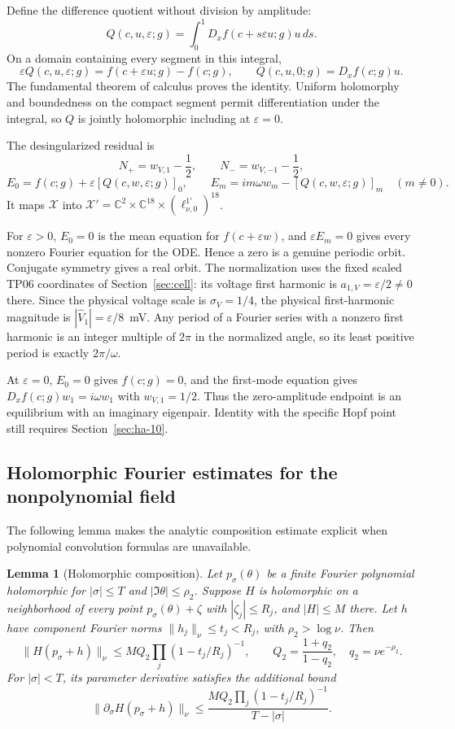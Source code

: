 \documentclass[11pt]{article}
\newtheorem{lemma}{Lemma}[section]
\theoremstyle{definition}
\begin{document}
Define the difference quotient without division by amplitude:
\[
 Q(c,u,\varepsilon;g)
 =\int_0^1 D_xf(c+s\varepsilon u;g)u\,ds.
\]
On a domain containing every segment in this integral,
\[
 \varepsilon Q(c,u,\varepsilon;g)
       =f(c+\varepsilon u;g)-f(c;g),
 \qquad Q(c,u,0;g)=D_xf(c;g)u.
\]
The fundamental theorem of calculus proves the identity. Uniform holomorphy and boundedness on the compact segment permit differentiation under the integral, so $Q$ is jointly holomorphic including at $\varepsilon=0$.

The desingularized residual is
\[
 N_+=w_{V,1}-\frac12,\qquad N_-=w_{V,-1}-\frac12,
\]
\[
 E_0=f(c;g)+\varepsilon[Q(c,w,\varepsilon;g)]_0,\qquad
 E_m=im\omega w_m-[Q(c,w,\varepsilon;g)]_m\quad(m\ne0).
\]
It maps $\mathcal X$ into
$\mathcal X'=\mathbb C^2\times\mathbb C^{18}\times(\ell^{1\prime}_{\nu,0})^{18}$.

For $\varepsilon>0$, $E_0=0$ is the mean equation for $f(c+\varepsilon w)$, and $\varepsilon E_m=0$ gives every nonzero Fourier equation for the ODE. Hence a zero is a genuine periodic orbit. Conjugate symmetry gives a real orbit. The normalization uses the fixed scaled TP06 coordinates of Section~\ref{sec:cell}: its voltage first harmonic is $a_{1,V}=\varepsilon/2\ne0$ there. Since the physical voltage scale is $\sigma_V=1/4$, the physical first-harmonic magnitude is $|\widehat V_1|=\varepsilon/8$~mV. Any period of a Fourier series with a nonzero first harmonic is an integer multiple of $2\pi$ in the normalized angle, so its least positive period is exactly $2\pi/\omega$.

At $\varepsilon=0$, $E_0=0$ gives $f(c;g)=0$, and the first-mode equation gives $D_xf(c;g)w_1=i\omega w_1$ with $w_{V,1}=1/2$. Thus the zero-amplitude endpoint is an equilibrium with an imaginary eigenpair. Identity with the specific Hopf point still requires Section~\ref{sec:ha-10}.

\subsection{Holomorphic Fourier estimates for the nonpolynomial field}\label{sec:ha-6}

The following lemma makes the analytic composition estimate explicit when polynomial convolution formulas are unavailable.

\begin{lemma}[Holomorphic composition]\label{lem:ha-composition} Let $p_\sigma(\theta)$ be a finite Fourier polynomial holomorphic for $|\sigma|\le T$ and $|\Im\theta|\le\rho_2$. Suppose $H$ is holomorphic on a neighborhood of every point
$p_\sigma(\theta)+\zeta$ with $|\zeta_j|\le R_j$, and $|H|\le M$ there. Let $h$ have component Fourier norms $\|h_j\|_\nu\le t_j<R_j$, with $\rho_2>\log\nu$. Then
\[
 \|H(p_\sigma+h)\|_\nu\le
 M Q_2\prod_j(1-t_j/R_j)^{-1},
 \qquad
 Q_2=\frac{1+q_2}{1-q_2},\quad q_2=\nu e^{-\rho_2}.
\]
For $|\sigma|<T$, its parameter derivative satisfies the additional bound
\[
 \|\partial_\sigma H(p_\sigma+h)\|_\nu
 \le \frac{M Q_2\prod_j(1-t_j/R_j)^{-1}}{T-|\sigma|}.
\]

\end{lemma}
\end{document}
